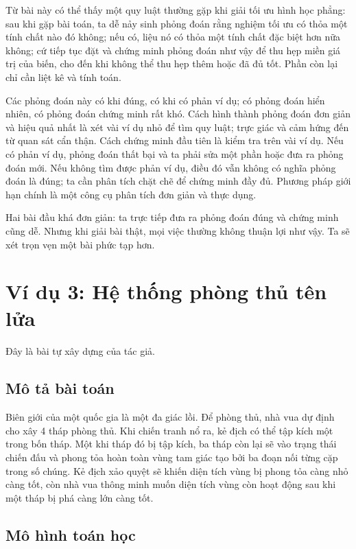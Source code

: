 \documentclass[11pt]{article}
\begin{document}
Từ bài này có thể thấy một quy luật thường gặp khi giải tối ưu hình học phẳng:
sau khi gặp bài toán, ta dễ nảy sinh phỏng đoán rằng nghiệm tối ưu có thỏa một
tính chất nào đó không; nếu có, liệu nó có thỏa một tính chất đặc biệt hơn nữa
không; cứ tiếp tục đặt và chứng minh phỏng đoán như vậy để thu hẹp miền giá
trị của biến, cho đến khi không thể thu hẹp thêm hoặc đã đủ tốt. Phần còn lại
chỉ cần liệt kê và tính toán.

Các phỏng đoán này có khi đúng, có khi có phản ví dụ; có phỏng đoán hiển nhiên,
có phỏng đoán chứng minh rất khó. Cách hình thành phỏng đoán đơn giản và hiệu
quả nhất là xét vài ví dụ nhỏ để tìm quy luật; trực giác và cảm hứng đến từ
quan sát cẩn thận. Cách chứng minh đầu tiên là kiểm tra trên vài ví dụ. Nếu có
phản ví dụ, phỏng đoán thất bại và ta phải sửa một phần hoặc đưa ra phỏng đoán
mới. Nếu không tìm được phản ví dụ, điều đó vẫn không có nghĩa phỏng đoán là
đúng; ta cần phân tích chặt chẽ để chứng minh đầy đủ. Phương pháp giới hạn
chính là một công cụ phân tích đơn giản và thực dụng.

Hai bài đầu khá đơn giản: ta trực tiếp đưa ra phỏng đoán đúng và chứng minh
cũng dễ. Nhưng khi giải bài thật, mọi việc thường không thuận lợi như vậy. Ta
sẽ xét trọn vẹn một bài phức tạp hơn.

\section{Ví dụ 3: Hệ thống phòng thủ tên lửa}

Đây là bài tự xây dựng của tác giả.

\subsection*{Mô tả bài toán}

Biên giới của một quốc gia là một đa giác lồi. Để phòng thủ, nhà vua dự định
cho xây 4 tháp phòng thủ. Khi chiến tranh nổ ra, kẻ địch có thể tập kích một
trong bốn tháp. Một khi tháp đó bị tập kích, ba tháp còn lại sẽ vào trạng thái
chiến đấu và phong tỏa hoàn toàn vùng tam giác tạo bởi ba đoạn nối từng cặp
trong số chúng. Kẻ địch xảo quyệt sẽ khiến diện tích vùng bị phong tỏa càng
nhỏ càng tốt, còn nhà vua thông minh muốn diện tích vùng còn hoạt động sau khi
một tháp bị phá càng lớn càng tốt.

\subsection*{Mô hình toán học}
\end{document}
